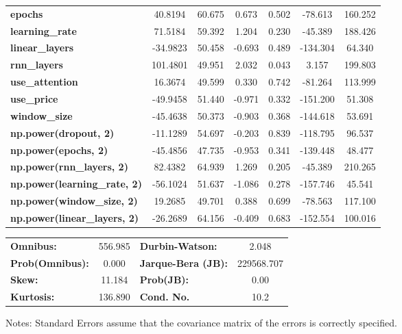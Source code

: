 \begin{center}
\begin{tabular}{lcccccc}
\textbf{epochs}                            &      40.8194  &       60.675     &     0.673  &         0.502        &      -78.613    &      160.252     \\
\textbf{learning\_rate}                    &      71.5184  &       59.392     &     1.204  &         0.230        &      -45.389    &      188.426     \\
\textbf{linear\_layers}                    &     -34.9823  &       50.458     &    -0.693  &         0.489        &     -134.304    &       64.340     \\
\textbf{rnn\_layers}                       &     101.4801  &       49.951     &     2.032  &         0.043        &        3.157    &      199.803     \\
\textbf{use\_attention}                    &      16.3674  &       49.599     &     0.330  &         0.742        &      -81.264    &      113.999     \\
\textbf{use\_price}                        &     -49.9458  &       51.440     &    -0.971  &         0.332        &     -151.200    &       51.308     \\
\textbf{window\_size}                      &     -45.4638  &       50.373     &    -0.903  &         0.368        &     -144.618    &       53.691     \\
\textbf{np.power(dropout, 2)}              &     -11.1289  &       54.697     &    -0.203  &         0.839        &     -118.795    &       96.537     \\
\textbf{np.power(epochs, 2)}               &     -45.4856  &       47.735     &    -0.953  &         0.341        &     -139.448    &       48.477     \\
\textbf{np.power(rnn\_layers, 2)}          &      82.4382  &       64.939     &     1.269  &         0.205        &      -45.389    &      210.265     \\
\textbf{np.power(learning\_rate, 2)}       &     -56.1024  &       51.637     &    -1.086  &         0.278        &     -157.746    &       45.541     \\
\textbf{np.power(window\_size, 2)}         &      19.2685  &       49.701     &     0.388  &         0.699        &      -78.563    &      117.100     \\
\textbf{np.power(linear\_layers, 2)}       &     -26.2689  &       64.156     &    -0.409  &         0.683        &     -152.554    &      100.016     \\
\bottomrule
\end{tabular}
\begin{tabular}{lclc}
\textbf{Omnibus:}       & 556.985 & \textbf{  Durbin-Watson:     } &     2.048   \\
\textbf{Prob(Omnibus):} &   0.000 & \textbf{  Jarque-Bera (JB):  } & 229568.707  \\
\textbf{Skew:}          &  11.184 & \textbf{  Prob(JB):          } &      0.00   \\
\textbf{Kurtosis:}      & 136.890 & \textbf{  Cond. No.          } &      10.2   \\
\bottomrule
\end{tabular}
\end{center}

Notes: \newline
 [1] Standard Errors assume that the covariance matrix of the errors is correctly specified.